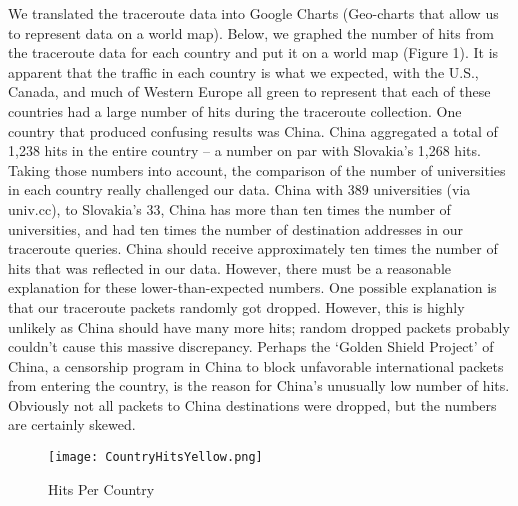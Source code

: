 \documentclass{sigcomm-alternate}
\begin{document}
We translated the traceroute data into Google Charts (Geo-charts that allow us to represent data on a world map). Below, we graphed the number of hits from the traceroute data for each country and put it on a world map (Figure 1). It is apparent that the traffic in each country is what we expected, with the U.S., Canada, and much of Western Europe all green to represent that each of these countries had a large number of hits during the traceroute collection. One country that produced confusing results was China. China aggregated a total of 1,238 hits in the entire country – a number on par with Slovakia’s 1,268 hits. Taking those numbers into account, the comparison of the number of universities in each country really challenged our data. China with 389 universities (via univ.cc), to Slovakia’s 33, China has more than ten times the number of universities, and had ten times the number of destination addresses in our traceroute queries. China should receive approximately ten times the number of hits that was reflected in our data. However, there must be a reasonable explanation for these lower-than-expected numbers. One possible explanation is that our traceroute packets randomly got dropped. However, this is highly unlikely as China should have many more hits; random dropped packets probably couldn’t cause this massive discrepancy. Perhaps the ‘Golden Shield Project’ of China, a censorship program in China to block unfavorable international packets from entering the country, is the reason for China’s unusually low number of hits. Obviously not all packets to China destinations were dropped, but the numbers are certainly skewed. 

\begin{figure}[h!]
  \caption{Hits Per Country}
  \centering
    \texttt{[image: CountryHitsYellow.png]}
\end{figure}
\end{document}

